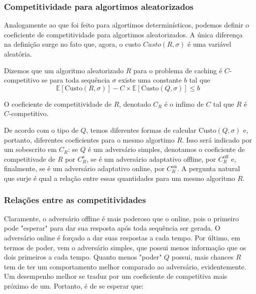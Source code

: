 \subsubsection{Competitividade para algortimos aleatorizados}

Analogamente ao que foi feito para algortimos determinísticos, podemos definir o coeficiente de competitividade para algortimos aleatorizados. A única diferença na definição surge no fato que, agora, o custo \(Custo(R, \sigma)\) é uma variável aleatória.

\begin{definition}
  Dizemos que um algoritmo aleatorizado \(R\) para o problema de caching é \(C\)-competitivo se para toda sequência \(\sigma\) existe uma constante \(b\) tal que
  \begin{equation}
    \mathbb{E}[\text{Custo}(R, \sigma)] - C \times \mathbb{E}[\text{Custo}(Q, \sigma)] \leqslant b
  \end{equation}
  
\end{definition}

O coeficiente de competitividade de \(R\), denotado \(C_R\) é o infímo de \(C\) tal que \(R\) é \(C\)-competitivo.

De acordo com o tipo de \(Q\), temos diferentes formas de calcular \(\text{Custo}(Q, \sigma)\) e, portanto, diferentes coeficientes para o mesmo algortimo \(R\). Isso será indicado por um sobescrito em \(C_R\): se \(Q\) é um adversário simples, denotamos o coeficiente de competitivade de \(R\) por \(C_R^{\text{s}}\), se é um adversário adaptativo offline, por \(C_R^{\text{off}}\) e, finalmente, se é um adversário adaptativo online, por \(C_R^{\text{on}}\). A pergunta natural que surje é qual a relação entre essas quantidades para um mesmo algoritmo \(R\).

\subsubsection{Relações entre as competitividades}

Claramente, o adversário offline é mais poderoso que o online, pois o primeiro pode "esperar" para dar sua resposta após toda sequência ser gerada. O adversário online é forçado a dar suas respostas a cada tempo. Por último, em termos de poder, vem o adversário simples, que possui menos informação que os dois primeiros a cada tempo. Quanto menos "poder" \(Q\) possui, mais chances \(R\) tem de ter um comportamento melhor comparado ao adversário, evidentemente. Um desempenho melhor se traduz por um coeficiente de competitiva mais próximo de um. Portanto, é de se esperar que:

